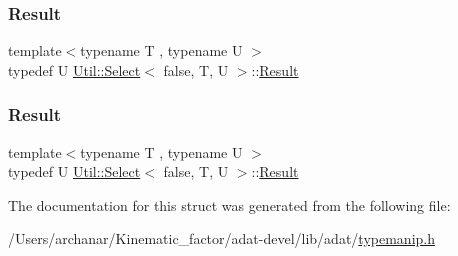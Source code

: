 \mbox{\label{structUtil_1_1Select_3_01false_00_01T_00_01U_01_4_a0fae7c144e474e3297046018b97cd287}} 
\subsubsection{\texorpdfstring{Result}{Result}\hspace{0.1cm}{\footnotesize\ttfamily [2/3]}}
{\footnotesize\ttfamily template$<$typename T , typename U $>$ \\
typedef U \mbox{\hyperlink{structUtil_1_1Select}{Util\+::\+Select}}$<$ false, T, U $>$\+::\mbox{\hyperlink{structUtil_1_1Select_3_01false_00_01T_00_01U_01_4_a0fae7c144e474e3297046018b97cd287}{Result}}}

\mbox{\label{structUtil_1_1Select_3_01false_00_01T_00_01U_01_4_a0fae7c144e474e3297046018b97cd287}} 
\subsubsection{\texorpdfstring{Result}{Result}\hspace{0.1cm}{\footnotesize\ttfamily [3/3]}}
{\footnotesize\ttfamily template$<$typename T , typename U $>$ \\
typedef U \mbox{\hyperlink{structUtil_1_1Select}{Util\+::\+Select}}$<$ false, T, U $>$\+::\mbox{\hyperlink{structUtil_1_1Select_3_01false_00_01T_00_01U_01_4_a0fae7c144e474e3297046018b97cd287}{Result}}}



The documentation for this struct was generated from the following file\+:\begin{DoxyCompactItemize}
\item 
/\+Users/archanar/\+Kinematic\+\_\+factor/adat-\/devel/lib/adat/\mbox{\hyperlink{adat-devel_2lib_2adat_2typemanip_8h}{typemanip.\+h}}\end{DoxyCompactItemize}
